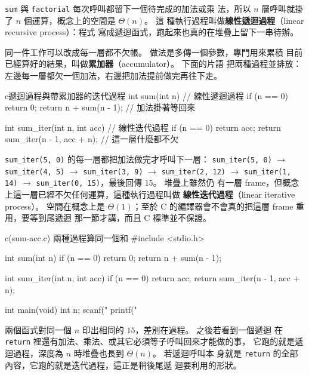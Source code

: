 \texttt{sum} 與 \texttt{factorial} 每次呼叫都留下一個待完成的加法或乘
法，所以 $n$ 層呼叫就掛了 $n$ 個運算，概念上的空間是 $\Theta(n)$。 這
種執行過程叫做\textbf{線性遞迴過程}（linear recursive process）：程式
寫成遞迴函式，跑起來也真的在堆疊上留下一串待辦。

同一件工作可以改成每一層都不欠帳。 做法是多傳一個參數，專門用來累積
目前已經算好的結果，叫做\textbf{累加器}（accumulator）。 下面的片語
把兩種過程並排放：左邊每一層都欠一個加法，右邊把加法提前做完再往下走。

\begin{code}{c}{遞迴過程與帶累加器的迭代過程}
int sum(int n) {                 // 線性遞迴過程
    if (n == 0) {
        return 0;
    }
    return n + sum(n - 1);       // 加法掛著等回來
}

int sum_iter(int n, int acc) {   // 線性迭代過程
    if (n == 0) {
        return acc;
    }
    return sum_iter(n - 1, acc + n);  // 這一層什麼都不欠
}
\end{code}

\texttt{sum\_iter(5, 0)} 的每一層都把加法做完才呼叫下一層：
\texttt{sum\_iter(5, 0)} $\rightarrow$ \texttt{sum\_iter(4, 5)}
$\rightarrow$ \texttt{sum\_iter(3, 9)} $\rightarrow$
\texttt{sum\_iter(2, 12)} $\rightarrow$ \texttt{sum\_iter(1, 14)}
$\rightarrow$ \texttt{sum\_iter(0, 15)}，最後回傳 $15$。 堆疊上雖然仍
有一層 frame，但概念上這一層已經不欠任何運算，這種執行過程叫做
\textbf{線性迭代過程}（linear iterative process）。 空間在概念上是
$\Theta(1)$；至於 C 的編譯器會不會真的把這層 frame 重用，要等到尾遞迴
那一節才講，而且 C 標準並不保證。

\begin{example}{c}{(sum-acc.c) 兩種過程算同一個和}
#include <stdio.h>

int sum(int n) {
    if (n == 0) {
        return 0;
    }
    return n + sum(n - 1);
}

int sum_iter(int n, int acc) {
    if (n == 0) {
        return acc;
    }
    return sum_iter(n - 1, acc + n);
}

int main(void) {
    int n;
    scanf("%
    printf("%
}
\end{example}


兩個函式對同一個 $n$ 印出相同的 $15$，差別在過程。 之後若看到一個遞迴
在 \texttt{return} 裡還有加法、乘法、或其它必須等子呼叫回來才能做的事，
它跑的就是遞迴過程，深度為 $n$ 時堆疊也長到 $\Theta(n)$。 若遞迴呼叫本
身就是 \texttt{return} 的全部內容，它跑的就是迭代過程，這正是稍後尾遞
迴要利用的形狀。


